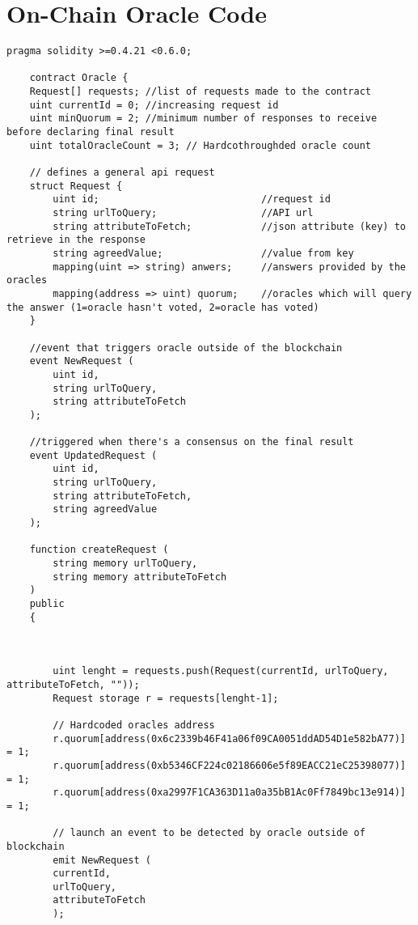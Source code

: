 \chapter{On-Chain Oracle Code} \label{ap2:on-chain-oracle-code}

\begin{lstlisting}[language=Solidity]
    pragma solidity >=0.4.21 <0.6.0;

    contract Oracle {
    Request[] requests; //list of requests made to the contract
    uint currentId = 0; //increasing request id
    uint minQuorum = 2; //minimum number of responses to receive before declaring final result
    uint totalOracleCount = 3; // Hardcothroughded oracle count

    // defines a general api request
    struct Request {
        uint id;                            //request id
        string urlToQuery;                  //API url
        string attributeToFetch;            //json attribute (key) to retrieve in the response
        string agreedValue;                 //value from key
        mapping(uint => string) anwers;     //answers provided by the oracles
        mapping(address => uint) quorum;    //oracles which will query the answer (1=oracle hasn't voted, 2=oracle has voted)
    }

    //event that triggers oracle outside of the blockchain
    event NewRequest (
        uint id,
        string urlToQuery,
        string attributeToFetch
    );

    //triggered when there's a consensus on the final result
    event UpdatedRequest (
        uint id,
        string urlToQuery,
        string attributeToFetch,
        string agreedValue
    );

    function createRequest (
        string memory urlToQuery,
        string memory attributeToFetch
    )
    public
    {



        uint lenght = requests.push(Request(currentId, urlToQuery, attributeToFetch, ""));
        Request storage r = requests[lenght-1];

        // Hardcoded oracles address
        r.quorum[address(0x6c2339b46F41a06f09CA0051ddAD54D1e582bA77)] = 1;
        r.quorum[address(0xb5346CF224c02186606e5f89EACC21eC25398077)] = 1;
        r.quorum[address(0xa2997F1CA363D11a0a35bB1Ac0Ff7849bc13e914)] = 1;

        // launch an event to be detected by oracle outside of blockchain
        emit NewRequest (
        currentId,
        urlToQuery,
        attributeToFetch
        );


\end{lstlisting}
